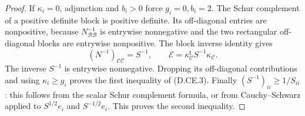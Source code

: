 \begin{proof}
If $\kappa_i=0$, adjunction and $b_i>0$ force $g_i=0,b_i=2$.
The Schur complement of a positive definite block is positive
definite. Its off-diagonal entries are nonpositive, because
$N_{\mathcal B\mathcal B}^{-1}$ is entrywise nonnegative and the
two rectangular off-diagonal blocks are entrywise nonpositive.
The block inverse identity gives
\[
 (N^{-1})_{\mathcal C\mathcal C}=S^{-1},\qquad
 \mathcal E=\kappa_{\mathcal C}^{\mathsf t}
                      S^{-1}\kappa_{\mathcal C}.
\]
The inverse $S^{-1}$ is entrywise nonnegative. Dropping its
off-diagonal contributions and using $\kappa_i\ge g_i$ proves
the first inequality of (D.CE.3). Finally
$(S^{-1})_{ii}\ge1/S_{ii}$: this follows from the scalar Schur
complement formula, or from Cauchy--Schwarz applied to
$S^{1/2}e_i$ and $S^{-1/2}e_i$. This proves the second inequality.
\end{proof}

